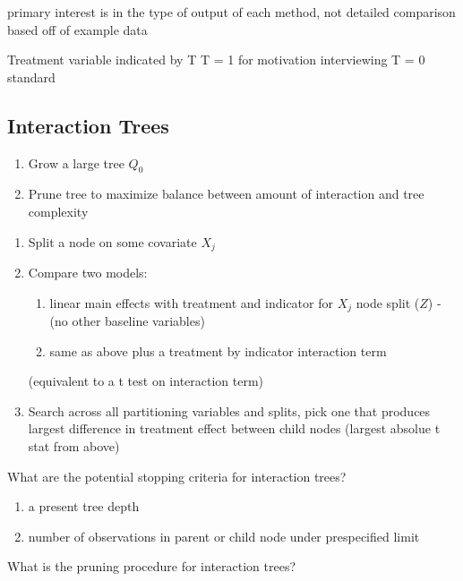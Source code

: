 \documentclass[10pt]{article}
\begin{document}
primary interest is in the type of output of each method, not detailed comparison based off of example data

Treatment variable indicated by T
T = 1 for motivation interviewing
T = 0 standard



\subsection{Interaction Trees} %
\label{sub:interaction_trees}

\begin{enumerate}
  \item Grow a large tree $Q_{0}$
  \item Prune tree to maximize balance between amount of interaction and tree complexity
\end{enumerate}

\begin{enumerate}
  \item Split a node on some covariate $X_j$
  \item Compare two models:
  \begin{enumerate}
    \item linear main effects with treatment and indicator for $X_j$ node split ($Z$) - (no other baseline variables)
    \item same as above plus a treatment by indicator interaction term
  \end{enumerate}
  
  (equivalent to a t test on interaction term)
  \item Search across all partitioning variables and splits, pick one that produces largest difference in treatment effect between child nodes (largest absolue t stat from above)
\end{enumerate}

\hrulefill

What are the potential stopping criteria for interaction trees?

\begin{enumerate}
  \item a present tree depth
  \item number of observations in parent or child node under prespecified limit
\end{enumerate}

\hrulefill

What is the pruning procedure for interaction trees?
\end{document}
